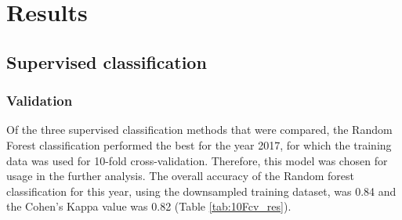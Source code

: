 \documentclass[11pt, A4, oneside]{report}
\begin{document}
\newpage
\chapter{Results}
\section{Supervised classification}\label{chap:supervised_classi}

\subsection{Validation}
Of the three supervised classification methods that were compared, the Random Forest classification performed the best for the year 2017, for which the training data was used for 10-fold cross-validation. Therefore, this model was chosen for usage in the further analysis. The overall accuracy of the Random forest classification for this year, using the downsampled training dataset, was 0.84 and the Cohen's Kappa value was 0.82 (Table \ref{tab:10Fcv_res}).
\end{document}
